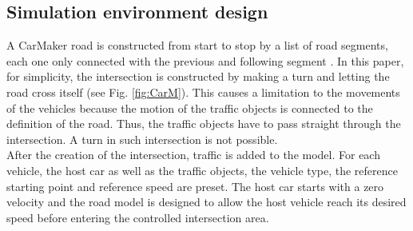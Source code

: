 \documentclass[letterpaper,10pt,conference]{ieeeconf}
\begin{document}
\subsection{Simulation environment design}
A CarMaker road is constructed from start to stop by a list of road segments, each one only connected with the previous and following segment \cite{guide}. In this paper, for simplicity, the intersection is constructed by making a turn and letting the road cross itself (see Fig. \ref{fig:CarM}). This causes a limitation to the movements of the vehicles because the motion of the traffic objects is connected to the definition of the road. Thus, the traffic objects have to pass straight through the intersection. A turn in such intersection is not possible.\\ \indent
After the creation of the intersection, traffic is added to the model. For each vehicle, the host car as well as the traffic objects, the vehicle type, the reference starting point and reference speed are preset. The host car starts with a zero velocity and the road model is designed to allow the host vehicle reach its desired speed before entering the controlled intersection area.
\end{document}
